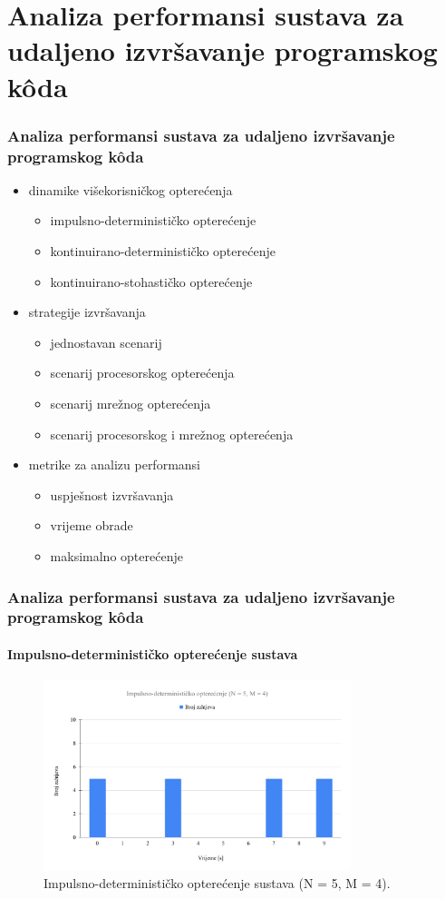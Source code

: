 \documentclass{beamer}
\newif\ifplacelogo
\begin{document}
\section{Analiza performansi sustava za udaljeno izvršavanje programskog kôda}
\begin{frame}
\frametitle{Analiza performansi sustava za udaljeno izvršavanje programskog kôda}
\begin{itemize}
	\item dinamike višekorisničkog opterećenja
	\begin{itemize}
		\item impulsno-determinističko opterećenje
		\item kontinuirano-determinističko opterećenje
		\item kontinuirano-stohastičko opterećenje
	\end{itemize}
	\item strategije izvršavanja
	\begin{itemize}
		\item jednostavan scenarij
		\item scenarij procesorskog opterećenja
		\item scenarij mrežnog opterećenja
		\item scenarij procesorskog i mrežnog opterećenja
	\end{itemize}
	\item metrike za analizu performansi
	\begin{itemize}
		\item uspješnost izvršavanja
		\item vrijeme obrade
		\item maksimalno opterećenje
	\end{itemize}
\end{itemize}
\end{frame}

\placelogofalse
\begin{frame}
\frametitle{Analiza performansi sustava za udaljeno izvršavanje programskog kôda}
\framesubtitle{Impulsno-determinističko opterećenje sustava}
\begin{figure}[htb]
	\centering
	\includegraphics[width=0.8\textwidth]{images/Impulsno-deterministicko opterecenje (N = 5, M = 4).pdf}
	\caption{
		Impulsno-determinističko opterećenje sustava (N = 5, M = 4).
	}
\end{figure}
\end{frame}
\placelogotrue
\end{document}
